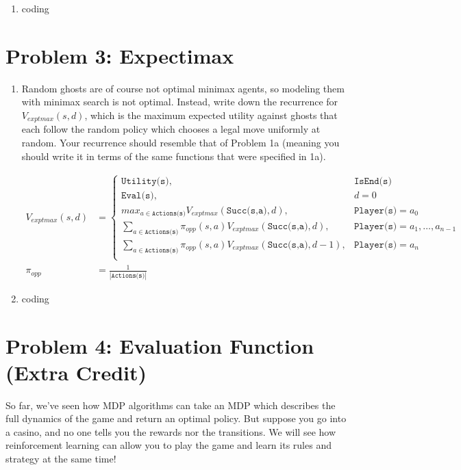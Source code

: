 \documentclass[10pt]{article}
\begin{document}
\begin{enumerate}[label=(\alph*)]
  \item coding

\end{enumerate}
\iffalse
\section*{\normalsize Problem 3: Expectimax}

\begin{enumerate}[label=(\alph*)]

  \item Random ghosts are of course not optimal minimax agents, so modeling them with minimax search is not optimal. Instead, write down the recurrence for $V_{exptmax}(s,d)$, which is the maximum expected utility against ghosts that each follow the random policy which chooses a legal move uniformly at random. Your recurrence should resemble that of Problem 1a (meaning you should write it in terms of the same functions that were specified in 1a).
  
  \begin{align*}
  V_{exptmax}(s,d) &= \begin{cases}
  \texttt{Utility(s)}, &\texttt{IsEnd(s)}\\
  \texttt{Eval(s)}, &d = 0\\
  max_{a \in \texttt{Actions(s)}}V_{exptmax}(\texttt{Succ(s,a)},d), &\texttt{Player(s)} = a_0\\
  \sum_{a \in \texttt{Actions(s)}}\pi_{opp}(s,a)V_{exptmax}(\texttt{Succ(s,a)},d), &\texttt{Player(s)} = a_1, \dots, a_{n-1}\\
  \sum_{a \in \texttt{Actions(s)}}\pi_{opp}(s,a)V_{exptmax}(\texttt{Succ(s,a)},d-1), &\texttt{Player(s)} = a_n\\
  \end{cases}\\ 
  \pi_{opp} &= \frac{1}{|\texttt{Actions(s)}|}
  \end{align*}
  
  \item coding
		
\end{enumerate}

\section*{\normalsize Problem 4: Evaluation Function (Extra Credit)}

So far, we've seen how MDP algorithms can take an MDP which describes the full dynamics of the game and return an optimal policy. But suppose you go into a casino, and no one tells you the rewards nor the transitions. We will see how reinforcement learning can allow you to play the game and learn its rules and strategy at the same time!
\end{document}
